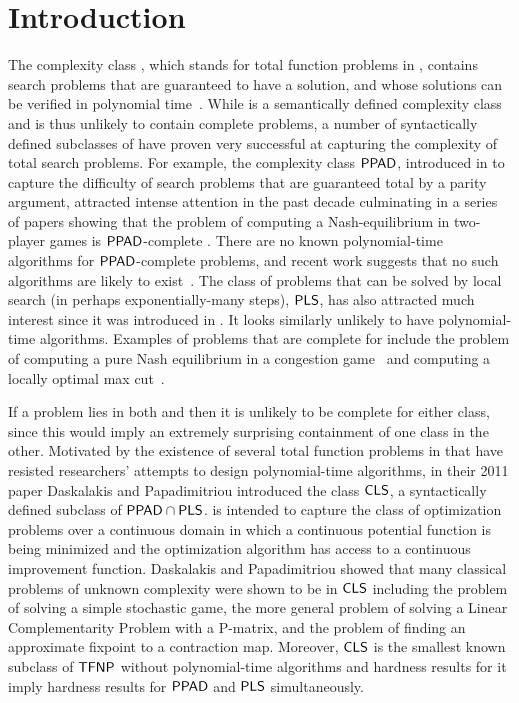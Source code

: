\chapter{Introduction}

The complexity class \TFNP, which stands for total function problems in
\NP, contains search problems that are guaranteed to have a solution, and whose
solutions can be verified in polynomial time~\cite{megiddo1991total}.
%
While \TFNP is a semantically defined complexity class and is thus unlikely to
contain complete problems, a number of syntactically defined subclasses of
\TFNP have proven very successful at capturing the complexity of total search 
problems.
For example, the complexity class $\mathsf{PPAD}$, introduced in
\cite{papadimitriou1994complexity} to capture the difficulty of search problems
that are guaranteed total by a parity argument, attracted intense attention in
the past decade culminating in a series of papers showing that the problem of
computing a Nash-equilibrium in two-player games is $\mathsf{PPAD}$-complete
\cite{chen2009settling,daskalakis2009complexity}. There are no known
polynomial-time algorithms for $\mathsf{PPAD}$-complete problems, and recent work
suggests that no such algorithms are likely to exist~\cite{bitansky2015cryptographic,garg2016revisiting}. 
The class of problems that
can be solved by local search (in perhaps exponentially-many steps), $\mathsf{PLS}$,
has also attracted much interest since it was introduced in
\cite{johnson1988easy}. It looks similarly unlikely to have polynomial-time
algorithms. Examples of problems that are complete for \PLS include the problem
of computing a pure Nash equilibrium in a congestion
game~\cite{fabrikant2004complexity} and computing a locally optimal max
cut~\cite{schaffer1991simple}.

If a problem lies in both \PPAD and \PLS then it is unlikely to be complete for 
either class, since this would imply an extremely surprising containment of one class in the other.
Motivated by the existence of several total function problems in \PPADPLS
that have resisted researchers' attempts to design polynomial-time algorithms,
in their 2011 paper \cite{daskalakis2011continuous} Daskalakis and Papadimitriou introduced
the class $\mathsf{CLS}$, a syntactically defined subclass of $\mathsf{PPAD} \cap \mathsf{PLS}$.
\CLS is intended to capture the class of optimization problems over a continuous
domain in which a continuous potential function is being minimized and the
optimization algorithm has access to a continuous improvement function.
Daskalakis and Papadimitriou showed that many classical problems of unknown
complexity were shown to be in $\mathsf{CLS}$ including the problem of solving a simple
stochastic game, the more general problem of solving a Linear Complementarity
Problem with a P-matrix, and the problem of finding an approximate fixpoint
to a contraction map. Moreover, $\mathsf{CLS}$ is the smallest known subclass of
$\mathsf{TFNP}$ without polynomial-time algorithms and hardness results for it imply hardness results for
$\mathsf{PPAD}$ and $\mathsf{PLS}$ simultaneously. 

